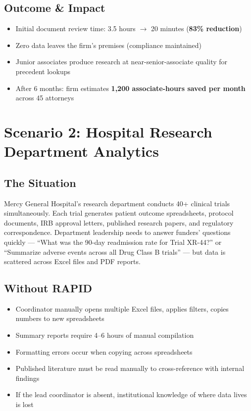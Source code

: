 \documentclass[12pt, a4paper, oneside]{report}
\begin{document}
\subsection*{Outcome \& Impact}
\begin{itemize}
  \item Initial document review time: 3.5 hours $\to$ 20 minutes (\textbf{83\% reduction})
  \item Zero data leaves the firm's premises (compliance maintained)
  \item Junior associates produce research at near-senior-associate quality for precedent lookups
  \item After 6 months: firm estimates \textbf{1,200 associate-hours saved per month} across 45 attorneys
\end{itemize}

\section{Scenario 2: Hospital Research Department Analytics}

\subsection*{The Situation}
Mercy General Hospital's research department conducts 40+ clinical trials simultaneously.
Each trial generates patient outcome spreadsheets, protocol documents, IRB approval letters,
published research papers, and regulatory correspondence. Department leadership needs to
answer funders' questions quickly — ``What was the 90-day readmission rate for Trial XR-44?''
or ``Summarize adverse events across all Drug Class B trials'' — but data is scattered across
Excel files and PDF reports.

\subsection*{Without RAPID}
\begin{itemize}
  \item Coordinator manually opens multiple Excel files, applies filters, copies numbers to new spreadsheets
  \item Summary reports require 4--6 hours of manual compilation
  \item Formatting errors occur when copying across spreadsheets
  \item Published literature must be read manually to cross-reference with internal findings
  \item If the lead coordinator is absent, institutional knowledge of where data lives is lost
\end{itemize}
\end{document}
